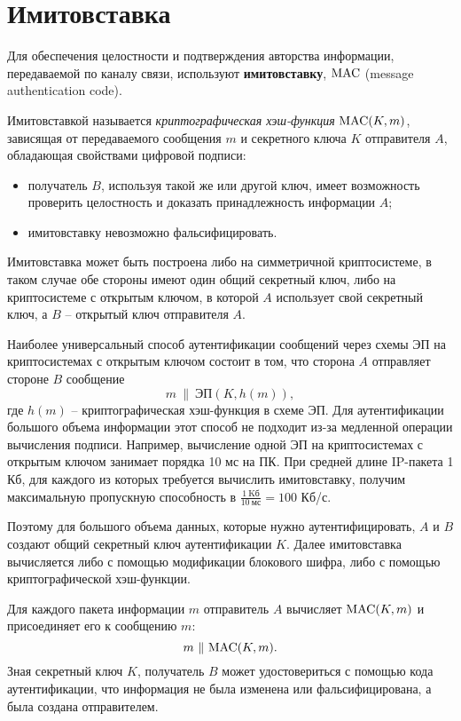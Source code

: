\section{Имитовставка}\label{section-MAC}

Для обеспечения целостности и подтверждения авторства информации, передаваемой по каналу связи, используют \textbf{имитовставку}, $\textrm{MAC}$ (message authentication code).

Имитовставкой называется \emph{криптографическая хэш-функция} $\textrm{MAC}(K,m)$, зависящая от передаваемого сообщения $m$ и секретного ключа $K$ отправителя $A$, обладающая свойствами цифровой подписи:
\begin{itemize}
    \item получатель $B$, используя такой же или другой ключ, имеет возможность проверить целостность и доказать принадлежность информации $A$;
    \item имитовставку невозможно фальсифицировать.
\end{itemize}

Имитовставка может быть построена либо на симметричной криптосистеме, в таком случае обе стороны имеют один общий секретный ключ, либо на криптосистеме с открытым ключом, в которой $A$ использует свой секретный ключ, а $B$ -- открытый ключ отправителя $A$.

Наиболее универсальный способ аутентификации сообщений через схемы ЭП на криптосистемах с открытым ключом состоит в том, что сторона $A$ отправляет стороне $B$ сообщение
    \[ m ~\|~ \textrm{ЭП}(K, h(m)), \]
где $h(m)$ -- криптографическая хэш-функция в схеме ЭП. Для аутентификации большого объема информации этот способ не подходит из-за медленной операции вычисления подписи. Например, вычисление одной ЭП на криптосистемах с открытым ключом занимает порядка 10 мс на ПК. При средней длине IP-пакета 1 Кб, для каждого из которых требуется вычислить имитовставку, получим максимальную пропускную способность в $\frac{1 ~ \text{Kб}}{10 ~ \text{мс}} = 100$ Кб/с.

Поэтому для большого объема данных, которые нужно аутентифицировать, $A$ и $B$ создают общий секретный ключ аутентификации $K$. Далее имитовставка вычисляется либо с помощью модификации блокового шифра, либо с помощью криптографической хэш-функции.

Для каждого пакета информации $m$ отправитель $A$ вычисляет $\textrm{MAC}(K,m)$ и присоединяет его к сообщению $m$:
    \[ m ~ \|~ \textrm{MAC}(K,m). \]
Зная секретный ключ $K$, получатель $B$ может удостовериться с помощью кода аутентификации, что информация не была изменена или фальсифицирована, а была создана отправителем.

